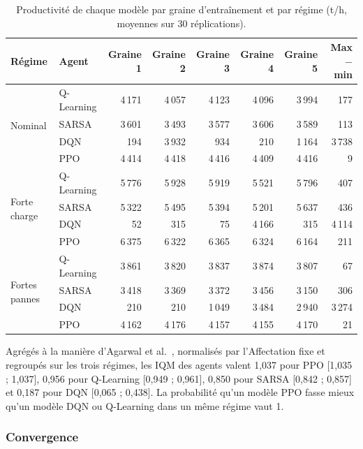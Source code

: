 \documentclass[11pt,a4paper]{article}
\newif\ifrevmarks
\newcommand{\revtag}[1]{\ifrevmarks\textsuperscript{\textcolor{red!70!black}{\scriptsize[#1]}}\fi}
\newenvironment{revbloc}[1]{\par\ifrevmarks\color{revcolor}\noindent\revtag{#1}\ \fi}{\par}
\begin{document}
\begin{revbloc}{T31}
\begin{table}[H]
\centering
\caption{Productivité de chaque modèle par graine d'entraînement et par régime (t/h, moyennes sur 30 réplications).}
\label{tab:runs}
\small
\setlength{\tabcolsep}{4pt}
\begin{tabular}{@{}llrrrrrr@{}}
\toprule
\textbf{Régime} & \textbf{Agent} & \textbf{Graine 1} & \textbf{Graine 2} & \textbf{Graine 3} & \textbf{Graine 4} & \textbf{Graine 5} & \textbf{Max $-$ min} \\
\midrule
\multirow{4}{*}{Nominal} & Q-Learning & 4\,171 & 4\,057 & 4\,123 & 4\,096 & 3\,994 & 177 \\
 & SARSA & 3\,601 & 3\,493 & 3\,577 & 3\,606 & 3\,589 & 113 \\
 & DQN & 194 & 3\,932 & 934 & 210 & 1\,164 & 3\,738 \\
 & PPO & 4\,414 & 4\,418 & 4\,416 & 4\,409 & 4\,416 & 9 \\
\midrule
\multirow{4}{*}{Forte charge} & Q-Learning & 5\,776 & 5\,928 & 5\,919 & 5\,521 & 5\,796 & 407 \\
 & SARSA & 5\,322 & 5\,495 & 5\,394 & 5\,201 & 5\,637 & 436 \\
 & DQN & 52 & 315 & 75 & 4\,166 & 315 & 4\,114 \\
 & PPO & 6\,375 & 6\,322 & 6\,365 & 6\,324 & 6\,164 & 211 \\
\midrule
\multirow{4}{*}{Fortes pannes} & Q-Learning & 3\,861 & 3\,820 & 3\,837 & 3\,874 & 3\,807 & 67 \\
 & SARSA & 3\,418 & 3\,369 & 3\,372 & 3\,456 & 3\,150 & 306 \\
 & DQN & 210 & 210 & 1\,049 & 3\,484 & 2\,940 & 3\,274 \\
 & PPO & 4\,162 & 4\,176 & 4\,157 & 4\,155 & 4\,170 & 21 \\
\bottomrule
\end{tabular}
\end{table}

Agrégés à la manière d'Agarwal et al.~\cite{Agarwal2021}, normalisés par l'Affectation fixe et regroupés sur les trois régimes, les IQM des agents valent 1,037 pour PPO [1,035 ; 1,037], 0,956 pour Q-Learning [0,949 ; 0,961], 0,850 pour SARSA [0,842 ; 0,857] et 0,187 pour DQN [0,065 ; 0,438]. La probabilité qu'un modèle PPO fasse mieux qu'un modèle DQN ou Q-Learning dans un même régime vaut 1.
\end{revbloc}

\subsubsection{Convergence}
\label{sec:convergence}
\end{document}
